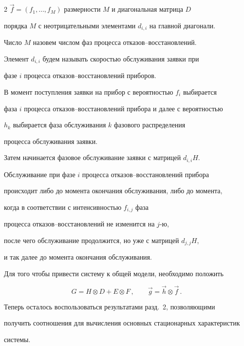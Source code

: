 \begin{multicols}{2}
$\vec f=(f_1,\ldots,f_M)$ размерности $M$ и диагональная матрица $D$


порядка $M$ с неотрицательными элементами $d_{i,i}$ на главной диагонали.


Число $M$ назовем числом фаз процесса отказов--восстановлений.


Элемент $d_{i,i}$ будем называть скоростью обслуживания заявки при


фазе $i$ процесса отказов--восстановлений приборов.





В момент поступления заявки на прибор с вероятностью $f_i$ выбирается


фаза $i$ процесса отказов--восстановлений прибора и далее с вероятностью


$h_k$ выбирается фаза обслуживания $k$ фазового распределения


процесса обслуживания заявки.


Затем начинается фазовое обслуживание заявки с матрицей $d_{i,i}H$.


Обслуживание при фазе $i$ процесса отказов--восстановлений прибора


происходит либо до момента окончания обслуживания, либо до момента,


когда в соответствии с интенсивностью $f_{i,j}$ фаза


процесса отказов--восстановлений не изменится на $j$-ю,


после чего обслуживание продолжится, но уже с матрицей $d_{j,j}H$,


и так далее до момента окончания обслуживания.








Для того чтобы привести систему к общей модели, необходимо положить


$$


G =


H \otimes D + E \otimes F\,,\qquad


\vec g =


\vec h \otimes \vec f\,.


$$


Теперь осталось воспользоваться результатами разд.~2, позволяющими


получить соотношения для вычисления основных стационарных характеристик


системы.






\end{multicols}
